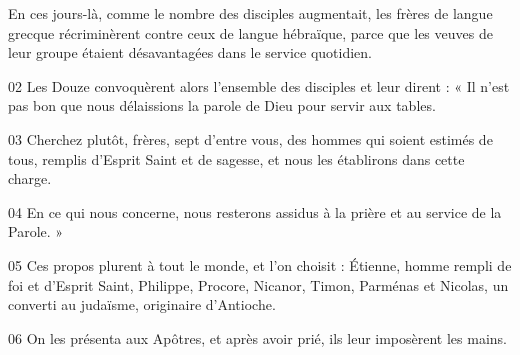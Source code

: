 En ces jours-là, comme le nombre des disciples augmentait, les frères de langue grecque récriminèrent contre ceux de langue hébraïque, parce que les veuves de leur groupe étaient désavantagées dans le service quotidien.

02 Les Douze convoquèrent alors l’ensemble des disciples et leur dirent : « Il n’est pas bon que nous délaissions la parole de Dieu pour servir aux tables.

03 Cherchez plutôt, frères, sept d’entre vous, des hommes qui soient estimés de tous, remplis d’Esprit Saint et de sagesse, et nous les établirons dans cette charge.

04 En ce qui nous concerne, nous resterons assidus à la prière et au service de la Parole. »

05 Ces propos plurent à tout le monde, et l’on choisit : Étienne, homme rempli de foi et d’Esprit Saint, Philippe, Procore, Nicanor, Timon, Parménas et Nicolas, un converti au judaïsme, originaire d’Antioche.

06 On les présenta aux Apôtres, et après avoir prié, ils leur imposèrent les mains.